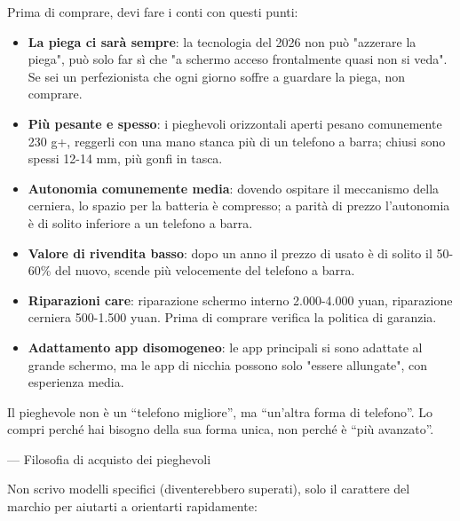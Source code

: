 
Prima di comprare, devi fare i conti con questi punti:

\begin{itemize}
  \item \textbf{La piega ci sarà sempre}: la tecnologia del 2026 non può "azzerare la piega", può solo far sì che "a schermo acceso frontalmente quasi non si veda". Se sei un perfezionista che ogni giorno soffre a guardare la piega, non comprare.
  \item \textbf{Più pesante e spesso}: i pieghevoli orizzontali aperti pesano comunemente 230 g+, reggerli con una mano stanca più di un telefono a barra; chiusi sono spessi 12-14 mm, più gonfi in tasca.
  \item \textbf{Autonomia comunemente media}: dovendo ospitare il meccanismo della cerniera, lo spazio per la batteria è compresso; a parità di prezzo l'autonomia è di solito inferiore a un telefono a barra.
  \item \textbf{Valore di rivendita basso}: dopo un anno il prezzo di usato è di solito il 50-60\% del nuovo, scende più velocemente del telefono a barra.
  \item \textbf{Riparazioni care}: riparazione schermo interno 2.000-4.000 yuan, riparazione cerniera 500-1.500 yuan. Prima di comprare verifica la politica di garanzia.
  \item \textbf{Adattamento app disomogeneo}: le app principali si sono adattate al grande schermo, ma le app di nicchia possono solo "essere allungate", con esperienza media.
\end{itemize}

Il pieghevole non è un “telefono migliore”, ma “un'altra forma di telefono”. Lo compri perché hai bisogno della sua forma unica, non perché è “più avanzato”.

— Filosofia di acquisto dei pieghevoli


Non scrivo modelli specifici (diventerebbero superati), solo il carattere del marchio per aiutarti a orientarti rapidamente:

